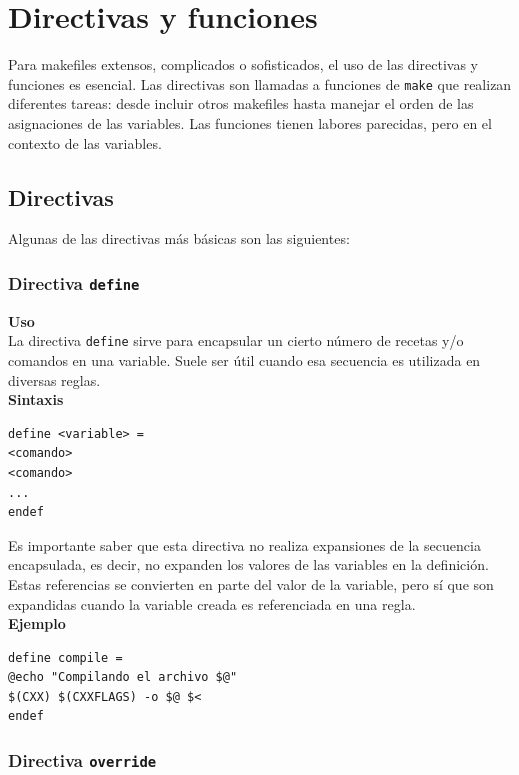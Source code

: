 \documentclass[11pt,twoside,titlepage,a4paper]{article}
\theoremstyle{definition}
\theoremstyle{plain_rojo}
\theoremstyle{remark}
\begin{document}

\section{Directivas y funciones}

Para makefiles extensos, complicados o sofisticados, el uso de las 
directivas y funciones es esencial. Las directivas son llamadas a funciones 
de \texttt{make} que realizan diferentes tareas: desde incluir otros 
makefiles hasta manejar el orden de las asignaciones de las variables. Las 
funciones tienen labores parecidas, pero en el contexto de las variables.

\subsection{Directivas}

Algunas de las directivas más básicas son las siguientes:

\subsubsection{Directiva \texttt{define}}

\textbf{\textcolor{burdeos}{Uso}}
\\La directiva \texttt{define} sirve para encapsular un cierto número de 
recetas y/o comandos en una variable. Suele ser útil cuando esa secuencia es 
utilizada en diversas reglas.
\\

\textbf{\textcolor{burdeos}{Sintaxis}}
\begin{lstlisting}
define <variable> = 
<comando>
<comando>
...
endef
\end{lstlisting}
Es importante saber que esta directiva no realiza expansiones de la 
secuencia encapsulada, es decir, no expanden los valores de las 
variables en la definición. Estas referencias se convierten en parte del 
valor de la variable, pero sí que son expandidas cuando la variable
creada es referenciada en una regla.
\\

\textbf{\textcolor{burdeos}{Ejemplo}}
\begin{lstlisting}
define compile =
@echo "Compilando el archivo $@"
$(CXX) $(CXXFLAGS) -o $@ $<
endef
\end{lstlisting}

\subsubsection{Directiva \texttt{override}}
\end{document}
